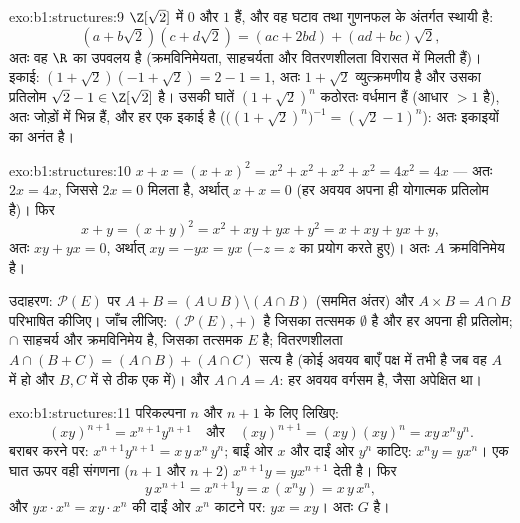 \begin{solution}{exo:b1:structures:9}
$\Z[\sqrt 2]$ में $0$ और $1$ हैं, और वह घटाव तथा गुणनफल के अंतर्गत स्थायी
है:
\[
(a + b\sqrt 2)(c + d\sqrt 2) = (ac + 2bd) + (ad + bc)\sqrt 2 ,
\]
अतः वह $\R$ का उपवलय है (क्रमविनिमेयता, साहचर्यता और वितरणशीलता विरासत में
मिलती हैं)। इकाई: $(1 + \sqrt 2)(-1 + \sqrt 2) = 2 - 1 = 1$, अतः $1 + \sqrt
2$ व्युत्क्रमणीय है और उसका प्रतिलोम $\sqrt 2 - 1 \in \Z[\sqrt 2]$ है। उसकी
घातें $(1 + \sqrt 2)^n$ कठोरतः वर्धमान हैं (आधार $> 1$ है), अतः जोड़ों में
भिन्न हैं, और हर एक इकाई है ($\bigl((1+\sqrt2)^n\bigr)^{-1} = (\sqrt 2 -
1)^n$): अतः इकाइयों का  अनंत है।
\end{solution}

\begin{solution}{exo:b1:structures:10}
$x + x = (x + x)^2 = x^2 + x^2 + x^2 + x^2 = 4x^2 = 4x$ --- अतः $2x = 4x$,
जिससे $2x = 0$ मिलता है, अर्थात् $x + x = 0$ (हर अवयव अपना ही योगात्मक
प्रतिलोम है)। फिर
\[
x + y = (x+y)^2 = x^2 + xy + yx + y^2 = x + xy + yx + y ,
\]
अतः $xy + yx = 0$, अर्थात् $xy = -yx = yx$ ($-z = z$ का प्रयोग करते हुए)।
अतः $A$ क्रमविनिमेय है।

उदाहरण: $\mathcal{P}(E)$ पर $A + B = (A \cup B) \setminus (A \cap B)$ (सममित
अंतर) और $A \times B = A \cap B$ परिभाषित कीजिए। जाँच लीजिए:
$(\mathcal{P}(E), +)$  है जिसका तत्समक $\emptyset$ है और हर
 अपना ही प्रतिलोम; $\cap$ साहचर्य और क्रमविनिमेय है, जिसका तत्समक $E$
है; वितरणशीलता $A \cap (B + C) = (A \cap B) + (A \cap C)$ सत्य है (कोई अवयव
बाएँ पक्ष में तभी है जब वह $A$ में हो और $B, C$ में से ठीक एक में)। और $A
\cap A = A$: हर अवयव वर्गसम है, जैसा अपेक्षित था।
\end{solution}

\begin{solution}{exo:b1:structures:11}
परिकल्पना $n$ और $n+1$ के लिए लिखिए:
\[
(xy)^{n+1} = x^{n+1} y^{n+1}
\quad\text{और}\quad
(xy)^{n+1} = (xy)(xy)^n = xy\,x^n y^n .
\]
बराबर करने पर: $x^{n+1} y^{n+1} = x\,y\,x^n\,y^n$; बाईं ओर $x$ और दाईं ओर
$y^n$ काटिए: $x^n y = y x^n$। एक घात ऊपर वही संगणना ($n+1$ और $n+2$)
$x^{n+1} y = y x^{n+1}$ देती है। फिर
\[
y\,x^{n+1} = x^{n+1} y = x\,(x^n y) = x\,y\,x^n ,
\]
और $y x \cdot x^n = x y \cdot x^n$ की दाईं ओर $x^n$ काटने पर: $yx = xy$। अतः
$G$  है।
\end{solution}

